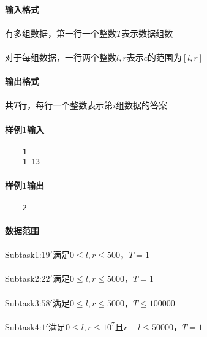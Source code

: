 \documentclass[UTF8]{ctexart}
\begin{document}
\paragraph{输入格式}
\paragraph{}有多组数据，第一行一个整数$T$表示数据组数
\paragraph{}对于每组数据，一行两个整数$l,r$表示$c$的范围为$[l,r]$
\paragraph{输出格式}
\paragraph{}共$T$行，每行一个整数表示第$i$组数据的答案
\paragraph{样例1输入}
\begin{lstlisting}
    1
    1 13
\end{lstlisting}
\paragraph{样例1输出}
\begin{lstlisting}
    2
\end{lstlisting}

\clearpage

\paragraph{数据范围}
\paragraph{}Subtask1:$19'$满足$0\leq l,r\leq 500$，$T=1$
\paragraph{}Subtask2:$22'$满足$0\leq l,r\leq 5000$，$T=1$
\paragraph{}Subtask3:$58'$满足$0\leq l,r\leq 5000$，$T\leq 100000$
\paragraph{}Subtask4:$1'$满足$0\leq l,r\leq 10^7$且$r-l\leq 50000$，$T=1$
\end{document}
